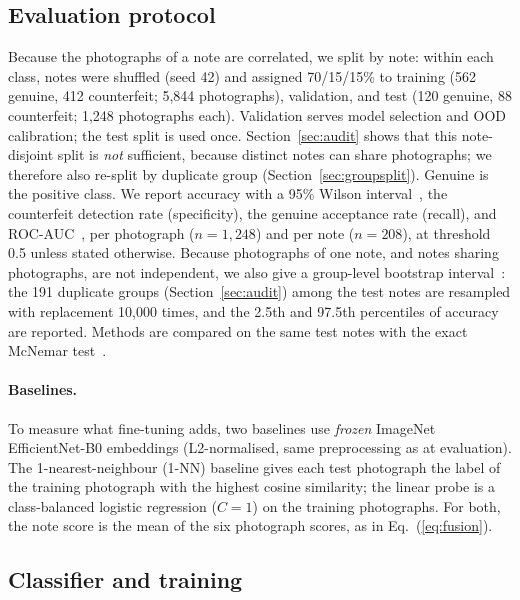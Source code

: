 \documentclass[pdflatex,iicol,sn-mathphys-num]{sn-jnl}
\begin{document}
\subsection{Evaluation protocol}\label{sec:protocol}

Because the photographs of a note are correlated, we split by note: within each class,
notes were shuffled (seed 42) and assigned 70/15/15\% to training (562 genuine, 412
counterfeit; 5{,}844 photographs), validation, and test (120 genuine, 88 counterfeit;
1{,}248 photographs each). Validation serves model selection and OOD calibration; the
test split is used once. Section~\ref{sec:audit} shows that this note-disjoint split is
\emph{not} sufficient, because distinct notes can share photographs; we therefore also
re-split by duplicate group (Section~\ref{sec:groupsplit}). Genuine is the
positive class. We report accuracy with a 95\% Wilson
interval~\cite{wilson1927probable}, the counterfeit detection rate (specificity), the
genuine acceptance rate (recall), and ROC-AUC~\cite{fawcett2006roc}, per photograph
($n=1{,}248$) and per note ($n=208$), at threshold 0.5 unless stated otherwise.
Because photographs of one note, and notes sharing photographs, are not independent,
we also give a group-level bootstrap
interval~\cite{efron1993bootstrap}: the 191 duplicate groups (Section~\ref{sec:audit})
among the test notes are resampled with replacement 10{,}000 times, and the 2.5th and
97.5th percentiles of accuracy are reported. Methods are compared on the same test notes
with the exact McNemar test~\cite{mcnemar1947,dietterich1998tests}.

\paragraph{Baselines.} To measure what fine-tuning adds, two baselines use \emph{frozen}
ImageNet EfficientNet-B0 embeddings (L2-normalised, same preprocessing as at
evaluation). The 1-nearest-neighbour (1-NN) baseline gives each test photograph the
label of the training photograph with the highest cosine similarity; the linear probe is
a class-balanced logistic regression ($C=1$) on the training photographs. For both, the
note score is the mean of the six photograph scores, as in Eq.~(\ref{eq:fusion}).

\subsection{Classifier and training}\label{sec:training}
\end{document}
